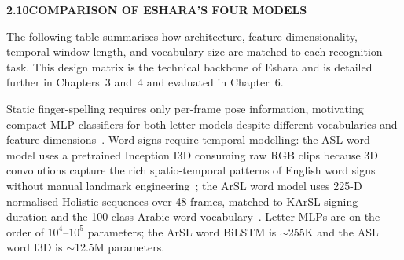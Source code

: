 \noindent\textbf{2.10\quad COMPARISON OF ESHARA'S FOUR MODELS}\par
{}
\vspace{0.2cm}

\noindent The following table summarises how architecture, feature dimensionality, temporal window length, and vocabulary size are matched to each recognition task. This design matrix is the technical backbone of Eshara and is detailed further in Chapters~3 and~4 and evaluated in Chapter~6.\par\vspace{0.2cm}

\begin{table}[H]
\centering
\caption{Architecture comparison of Eshara's four graduation models.}
\label{tab:four-models}
\footnotesize
{}
\end{table}
\vspace{0.2cm}

\noindent Static finger-spelling requires only per-frame pose information, motivating compact MLP classifiers for both letter models despite different vocabularies and feature dimensions~\cite{akash2019aslalphabet,arthur2018arasl2018}. Word signs require temporal modelling: the ASL word model uses a pretrained Inception I3D consuming raw RGB clips because 3D convolutions capture the rich spatio-temporal patterns of English word signs without manual landmark engineering~\cite{li2020wlasl}; the ArSL word model uses 225-D normalised Holistic sequences over 48 frames, matched to KArSL signing duration and the 100-class Arabic word vocabulary~\cite{sidig2021karsl}. Letter MLPs are on the order of $10^4$--$10^5$ parameters; the ArSL word BiLSTM is $\sim$255K and the ASL word I3D is $\sim$12.5M parameters.\par\vspace{0.2cm}

